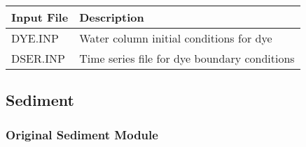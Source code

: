 \documentclass[letterpaper,10pt,english]{sphinxmanual}
\begin{document}
\begin{savenotes}\sphinxattablestart
\centering
\begin{tabulary}{\linewidth}[t]{|T|T|}
\hline
\sphinxstyletheadfamily 
Input File
&\sphinxstyletheadfamily 
Description
\\
\hline
DYE.INP
&
Water column initial conditions for dye
\\
\hline
DSER.INP
&
Time series file for dye boundary conditions
\\
\hline
\end{tabulary}
\par
\sphinxattableend\end{savenotes}


\subsection{Sediment}
\label{\detokenize{inputfiles/sediment/index:sediment}}\label{\detokenize{inputfiles/sediment/index:id1}}\label{\detokenize{inputfiles/sediment/index::doc}}

\subsubsection{Original Sediment Module}
\label{\detokenize{inputfiles/sediment/index:original-sediment-module}}
\end{document}
